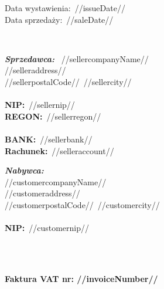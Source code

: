 \documentclass[12pt]{article}
\newcommand{\nipText}{\textbf{NIP:}}
\newcommand{\regonText}{\textbf{REGON:}}
\newcommand{\bankText}{\textbf{BANK:}}
\newcommand{\accountText}{\textbf{Rachunek:}}
\begin{document}
    \begin{footnotesize}
        \begin{flushright}
            \begin{minipage}[t]{.4\textwidth}
                Data wystawienia:~//issueDate// \\
                Data sprzedaży:~//saleDate//
            \end{minipage}
        \end{flushright}
    \end{footnotesize}

    \ \\

    \begin{small}
        \begin{minipage}[t]{.6\textwidth}
            \textbf{\emph{Sprzedawca:}} \
            //sellercompanyName// \\
            //selleraddress// \\
            //sellerpostalCode//~//sellercity// \\ \\
            \nipText~//sellernip// \\
            \regonText~//sellerregon// \\ \\
            \bankText~//sellerbank// \\
            \accountText~//selleraccount//
        \end{minipage}
        \begin{minipage}[t]{\textwidth}
            \textbf{\emph{Nabywca:}} \\
            //customercompanyName// \\
            //customeraddress// \\
            //customerpostalCode//~//customercity// \\ \\
            \nipText~//customernip//
        \end{minipage}
    \end{small}

    \ \\ \ \\

    \centerline{\textbf{\LARGE{Faktura VAT nr: //invoiceNumber//}}}

    \ \\
\end{document}
